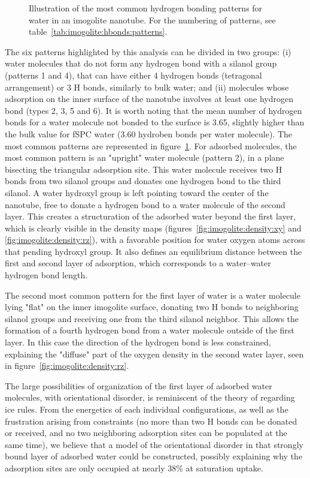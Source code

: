 \documentclass[thesis]{subfiles}
\begin{document}
\begin{figure}[t]
\caption{Illustration of the most common hydrogen bonding patterns for water in an imogolite nanotube. For the numbering of patterns, see table~\ref{tab:imogolite:hbonds:patterns}.}
\label{fig:imogolite:hbonds:patterns}
\end{figure}


The six patterns highlighted by this analysis can be divided in two groups: (i)
water molecules that do not form any hydrogen bond with a silanol group
(patterns 1 and 4), that can have either 4 hydrogen bonds (tetragonal
arrangement) or 3 H bonds, similarly to bulk water; and (ii) molecules whose
adsorption on the inner surface of the nanotube involves at least one hydrogen
bond (types 2, 3, 5 and 6). It is worth noting that the mean number of hydrogen
bonds for a water molecule not bonded to the surface is 3.65, slightly higher
than the bulk value for fSPC water (3.60 hydroben bonds per water molecule). The
most common patterns are represented in
figure~\ref{fig:imogolite:hbonds:patterns}. For adsorbed molecules, the most
common pattern is an "upright" water molecule (pattern 2), in a plane bisecting
the triangular adsorption site.  This water molecule receives two H bonds from
two silanol groups and donates one hydrogen bond to the third silanol. A water
hydroxyl group is left pointing toward the center of the nanotube, free to
donate a hydrogen bond to a water molecule of the second layer. This creates a
structuration of the adsorbed water beyond the first layer, which is clearly
visible in the density maps (figures~\ref{fig:imogolite:density:xy} and
\ref{fig:imogolite:density:rz}), with a favorable position for water oxygen
atoms across that pending hydroxyl group. It also defines an equilibrium
distance between the first and second layer of adsorption, which corresponds to
a water--water hydrogen bond length.

The second most common pattern for the first layer of water is a water molecule
lying "flat" on the inner imogolite surface, donating two H bonds to
neighboring silanol groups and receiving one from the third silanol neighbor.
This allows the formation of a fourth hydrogen bond from a water molecule
outside of the first layer. In this case the direction of the hydrogen bond is
less constrained, explaining the "diffuse" part of the oxygen density in the
second water layer, seen in figure~\ref{fig:imogolite:density:rz}.

The large possibilities of organization of the first layer of adsorbed water
molecules, with orientational disorder, is reminiscent of the theory of
\citeauthor{Bernal1933}\cite{Bernal1933} regarding ice rules. From the
energetics of each individual configurations, as well as the frustration arising
from constraints (no more than two H bonds can be donated or received, and no
two neighboring adsorption sites can be populated at the same time), we believe
that a model of the orientational disorder in that strongly bound layer of
adsorbed water could be constructed, possibly explaining why the adsorption
sites are only occupied at nearly {38\%} at saturation uptake.
\end{document}
